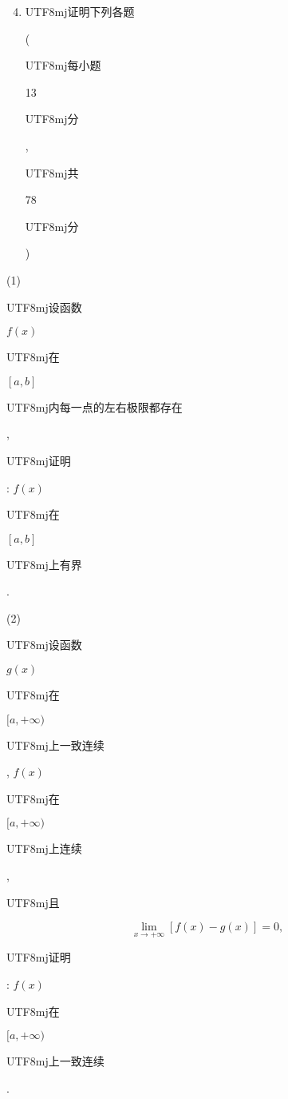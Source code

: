 \documentclass[10pt]{article}
\begin{document}
\begin{enumerate}
  \setcounter{enumi}{3}
  \item \begin{CJK}{UTF8}{mj}证明下列各题\end{CJK} (\begin{CJK}{UTF8}{mj}每小题\end{CJK} 13 \begin{CJK}{UTF8}{mj}分\end{CJK}, \begin{CJK}{UTF8}{mj}共\end{CJK} 78 \begin{CJK}{UTF8}{mj}分\end{CJK})
\end{enumerate}
(1) \begin{CJK}{UTF8}{mj}设函数\end{CJK} $f(x)$ \begin{CJK}{UTF8}{mj}在\end{CJK} $[a, b]$ \begin{CJK}{UTF8}{mj}内每一点的左右极限都存在\end{CJK}, \begin{CJK}{UTF8}{mj}证明\end{CJK}: $f(x)$ \begin{CJK}{UTF8}{mj}在\end{CJK} $[a, b]$ \begin{CJK}{UTF8}{mj}上有界\end{CJK}.

(2) \begin{CJK}{UTF8}{mj}设函数\end{CJK} $g(x)$ \begin{CJK}{UTF8}{mj}在\end{CJK} $[a,+\infty)$ \begin{CJK}{UTF8}{mj}上一致连续\end{CJK}, $f(x)$ \begin{CJK}{UTF8}{mj}在\end{CJK} $[a,+\infty)$ \begin{CJK}{UTF8}{mj}上连续\end{CJK}, \begin{CJK}{UTF8}{mj}且\end{CJK}
$$
\lim _{x \rightarrow+\infty}[f(x)-g(x)]=0,
$$
\begin{CJK}{UTF8}{mj}证明\end{CJK}: $f(x)$ \begin{CJK}{UTF8}{mj}在\end{CJK} $[a,+\infty)$ \begin{CJK}{UTF8}{mj}上一致连续\end{CJK}.
\end{document}
